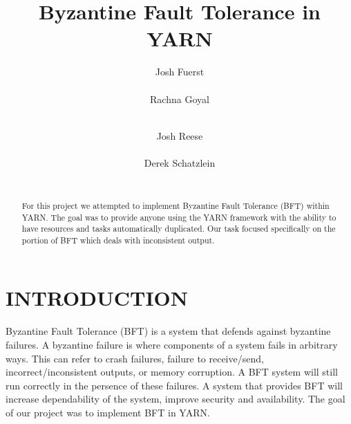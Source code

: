 \documentclass{sig-alternate}
\begin{document}
\title{Byzantine Fault Tolerance in YARN}

%
%

%
\author{
%
%
\alignauthor
Josh Fuerst\\
       \\
\alignauthor
Rachna Goyal\\
       \\
\and 
\alignauthor 
Josh Reese\\
       \\
\alignauthor 
Derek Schatzlein\\
       \\
}

\maketitle

\begin{abstract}
For this project we attempted to implement Byzantine Fault Tolerance (BFT) within YARN. The goal was to provide anyone using the 
YARN framework with the ability to have resources and tasks automatically duplicated. Our task focused specifically on the portion of 
BFT which deals with inconsistent output. 
\end{abstract}


\section{INTRODUCTION}
Byzantine Fault Tolerance (BFT) is a system that defends against byzantine failures. A byzantine failure is where components of 
a system fails in arbitrary ways. This can refer to crash failures, failure to receive/send, incorrect/inconsistent outputs, or 
memory corruption. A BFT system will still run correctly in the persence of these failures. A system that provides BFT will
increase dependability of the system, improve security and availability. The goal of our project was to implement BFT in YARN.
\end{document}
